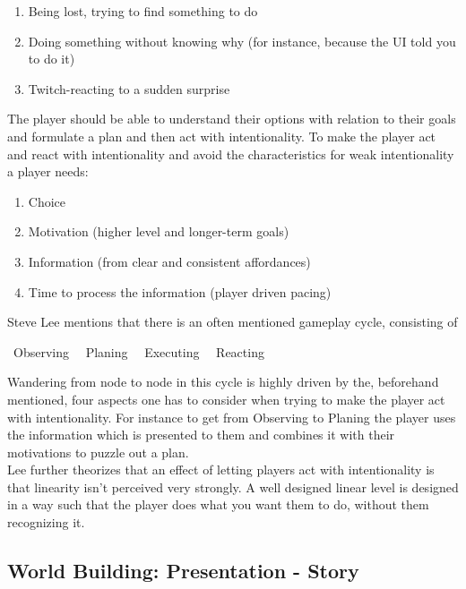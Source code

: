 \documentclass[a4paper]{article}
\begin{document}
\begin{enumerate}
\item Being lost, trying to find something to do
\item Doing something without knowing why (for instance, because the UI told you to do it)
\item Twitch-reacting to a sudden surprise
\end{enumerate}
The player should be able to understand their options with relation to their goals and formulate a plan and then act with intentionality. To make the player act and react with intentionality and avoid the characteristics for weak intentionality a player needs:
\begin{enumerate}
\item Choice
\item Motivation (higher level and longer-term goals)
\item Information (from clear and consistent affordances)
\item Time to process the information (player driven pacing)
\end{enumerate}
Steve Lee mentions that there is an often mentioned gameplay cycle, consisting of
\begin{center}\textrightarrow \ Observing \ \textrightarrow \ Planing \ \textrightarrow \  Executing \ \textrightarrow \ Reacting \ \textrightarrow\end{center}
Wandering from node to node in this cycle is highly driven by the, beforehand mentioned, four aspects one has to consider when trying to make the player act with intentionality. For instance to get from Observing to Planing the player uses the information which is presented to them and combines it with their motivations to puzzle out a plan.
\\
Lee further theorizes that an effect of letting players act with intentionality is that linearity isn't perceived very strongly. A well designed linear level is designed in a way such that the player does what you want them to do, without them recognizing it.

\subsection{World Building: Presentation - Story} \label{sssec:num2}
\end{document}

